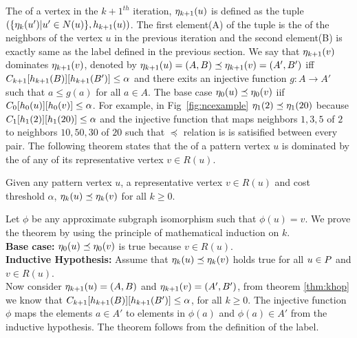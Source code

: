 The \ncl of a vertex in the ${k+1}^{th}$ iteration, $\eta_{k+1}(u)$ is
defined as
the tuple $(\{\eta_{k}(u') | u' \in N(u)\}, h_{k+1}(u))$.
The first element(A) of the tuple is the \ncl of the neighbors of the
vertex $u$ in the previous iteration and the second element(B) is exactly
same as the \khop label defined in the previous section. We say that
$\eta_{k+1}(v)$ dominates $\eta_{k+1}(v)$, denoted by 
$\eta_{k+1}(u) = (A, B) \preceq \eta_{k+1}(v) = (A', B') $ 
iff $C_{k+1}[h_{k+1}(B)][h_{k+1}(B')] \leq \alpha$ and there exits an injective
function $g\!\!:A\rightarrow A'$ such that $a \leq g(a)$ for 
all $a \in A$. The base case $\eta_{0}(u) \preceq \eta_{0}(v)$ iif 
$C_{0}[h_{0}(u)][h_{0}(v)] \leq \alpha$. For example, in Fig~\ref{fig:ncexample} 
$\eta_{1}(2) \preceq \eta_{1}(20)$ because $C_{1}[h_{1}(2)][h_{1}(20)] \leq \alpha$
and the injective function that maps neighbors $1, 3, 5$ of $2$ to neighbors
$10, 50, 30$ of $20$ such that $\preceq$ relation is
is satisified between every pair. The following theorem states that the \ncl of a pattern
vertex $u$ is dominated by the \ncl of any of its representative vertex
$v \in R(u)$.

\begin{thm}
Given any pattern vertex $u$, a representative vertex $v \in R(u)$ and cost
threshold $\alpha$, $\eta_{k}(u) \preceq \eta_{k}(v)$ for all
$k \geq 0$.
\begin{myproof} Let $\phi$ be any approximate subgraph isomorphism
such that $\phi(u) = v$.
We prove the theorem by using the principle of mathematical induction on $k$.\\
\textbf{Base case:} $\eta_{0}(u) \preceq \eta_{0}(v)$ is true because
$v \in R(u)$. \\
\textbf{Inductive Hypothesis:} Assume that $\eta_{k}(u) \preceq \eta_{k}(v)$
holds true for all $u \in P$ and $v \in R(u)$. \\
Now consider 
$\eta_{k+1}(u) = (A, B)$  and $ \eta_{k+1}(v) = (A', B') $, from theorem
\ref{thm:khop} we know that $C_{k+1}[h_{k+1}(B)][h_{k+1}(B')] \leq \alpha$, for all
$k \geq 0$. The injective function $\phi$ maps the elements $a \in A'$ to
elements in $\phi(a)$ and $\phi(a) \in A'$ from the inductive hypothesis.
The theorem follows from the definition of the \ncl label.
\end{myproof}
\label{thm:ncl}
\end{thm}

